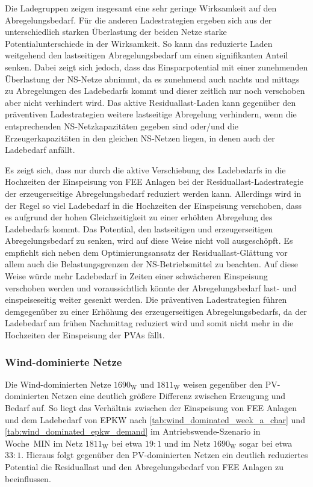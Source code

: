 Die Ladegruppen zeigen insgesamt eine sehr geringe Wirksamkeit auf den Abregelungsbedarf.
Für die anderen Ladestrategien ergeben sich aus der unterschiedlich starken Überlastung der beiden Netze starke Potentialunterschiede in der Wirksamkeit.
So kann das reduzierte Laden weitgehend den lastseitigen Abregelungsbedarf um einen signifikanten Anteil senken.
Dabei zeigt sich jedoch, dass das Einsparpotential mit einer zunehmenden Überlastung der \gls{NS}-Netze abnimmt, da es zunehmend auch nachts und mittags zu Abregelungen des Ladebedarfs kommt und dieser zeitlich nur noch verschoben aber nicht verhindert wird.
Das aktive Residuallast-Laden kann gegenüber den präventiven Ladestrategien weitere lastseitige Abregelung verhindern, wenn die entsprechenden \gls{NS}-Netzkapazitäten gegeben sind oder/und die Erzeugerkapazitäten in den gleichen \gls{NS}-Netzen liegen, in denen auch der Ladebedarf anfällt.\medskip

Es zeigt sich, dass nur durch die aktive Verschiebung des Ladebedarfs in die Hochzeiten der Einspeisung von \gls{FEE} Anlagen bei der Residuallast-Ladestrategie der erzeugerseitige Abregelungsbedarf reduziert werden kann.
Allerdings wird in der Regel so viel Ladebedarf in die Hochzeiten der Einspeisung verschoben, dass es aufgrund der hohen Gleichzeitigkeit zu einer erhöhten Abregelung des Ladebedarfs kommt.
Das Potential, den lastseitigen und erzeugerseitigen Abregelungsbedarf zu senken, wird auf diese Weise nicht voll ausgeschöpft.
Es empfiehlt sich neben dem Optimierungsansatz der Residuallast-Glättung vor allem auch die Belastungsgrenzen der \gls{NS}-Betriebsmittel zu beachten.
Auf diese Weise würde mehr Ladebedarf in Zeiten einer schwächeren Einspeisung verschoben werden und voraussichtlich könnte der Abregelungsbedarf last- und einspeiseseitig weiter gesenkt werden.
Die präventiven Ladestrategien führen demgegenüber zu einer Erhöhung des erzeugerseitigen Abregelungsbedarfs, da der Ladebedarf am frühen Nachmittag reduziert wird und somit nicht mehr in die Hochzeiten der Einspeisung der \glspl{PVA} fällt.


\subsubsection{Wind-dominierte Netze}\label{chap:wind_cur_results}

Die Wind-dominierten Netze \(1690_{\text{W}}\) und \(1811_{\text{W}}\) weisen gegenüber den \gls{PV}-dominierten Netzen eine deutlich größere Differenz zwischen Erzeugung und Bedarf auf.
So liegt das Verhältnis zwischen der Einspeisung von \gls{FEE} Anlagen und dem Ladebedarf von \gls{EPKW} nach \autoref{tab:wind_dominated_week_a_char} und \autoref{tab:wind_dominated_epkw_demand} im Antriebswende-Szenario in Woche~MIN im Netz \(1811_{\text{W}}\) bei etwa \(19:1\) und im Netz \(1690_{\text{W}}\) sogar bei etwa \(33:1\).
Hieraus folgt gegenüber den \gls{PV}-dominierten Netzen ein deutlich reduziertes Potential die Residuallast und den Abregelungsbedarf von \gls{FEE} Anlagen zu beeinflussen.

